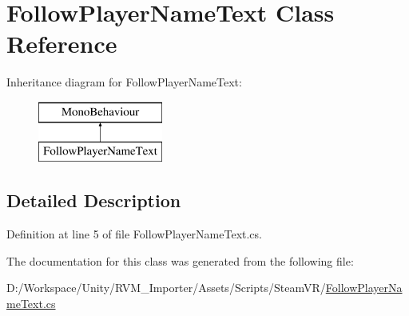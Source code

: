 \hypertarget{class_follow_player_name_text}{}\section{Follow\+Player\+Name\+Text Class Reference}
\label{class_follow_player_name_text}
Inheritance diagram for Follow\+Player\+Name\+Text\+:\begin{figure}[H]
\begin{center}
\leavevmode
\includegraphics[height=2.000000cm]{class_follow_player_name_text}
\end{center}
\end{figure}


\subsection{Detailed Description}


Definition at line 5 of file Follow\+Player\+Name\+Text.\+cs.



The documentation for this class was generated from the following file\+:\begin{DoxyCompactItemize}
\item 
D\+:/\+Workspace/\+Unity/\+R\+V\+M\+\_\+\+Importer/\+Assets/\+Scripts/\+Steam\+V\+R/\mbox{\hyperlink{_follow_player_name_text_8cs}{Follow\+Player\+Name\+Text.\+cs}}\end{DoxyCompactItemize}

